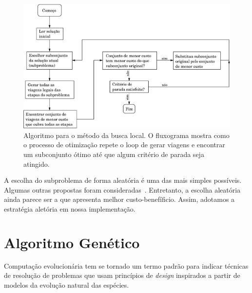 \begin{figure}[htbp]
	\begin{center}
		\includegraphics[scale=0.6]{fig/localsearch.eps}
		\caption{Algoritmo para o método da busca local. O fluxograma mostra como o processo de 
		otimização repete o loop de gerar viagens e encontrar um subconjunto ótimo até que
		algum critério de parada seja atingido.}
		\label{fig:busca_local}
	\end{center}
\end{figure}

A escolha do subproblema de forma aleatória é uma das mais simples possíveis. Algumas outras 
propostas foram consideradas~\cite{anbil91a,arabeyre69}. Entretanto, a escolha aleatória ainda
parece ser a que apresenta melhor custo-benefíficio. Assim, adotamos a estratégia aletória em nossa 
implementação.


\section{Algoritmo Genético}
\label{sec:metodos_genetico}

Computação evolucionária tem se tornado um termo padrão para indicar técnicas de resolução de 
problemas que usam princípios de {\it design} inspirados a partir de modelos da evolução natural das
espécies.

